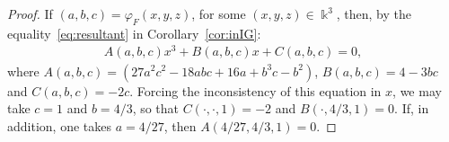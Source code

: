 \documentclass[11pt,reqno]{amsart}
\theoremstyle{definition}
\newcommand{\mbk}{\mbox{$\Bbbk$}}
\begin{document}
\begin{proof}
If $(a,b,c)=\varphi_F(x,y,z)$, for some $(x,y,z)\in\mbk^3$, then, 
by the equality~\eqref{eq:resultant} in Corollary~\ref{cor:inIG}:
\begin{eqnarray*}
A(a,b,c)x^3+B(a,b,c)x+C(a,b,c)=0,
\end{eqnarray*}
where $A(a,b,c)=(27a^2c^2-18abc+16a+b^3c-b^2)$, $B(a,b,c)=4-3bc$ and $C(a,b,c)=-2c$. Forcing
the inconsistency of this equation in $x$, we may take $c=1$ and $b=4/3$, so that
$C(\cdot,\cdot,1)=-2$ and $B(\cdot,4/3,1)=0$. 
If, in addition, one takes $a=4/27$, then $A(4/27,4/3,1)=0$. 

\end{proof}
\end{document}
